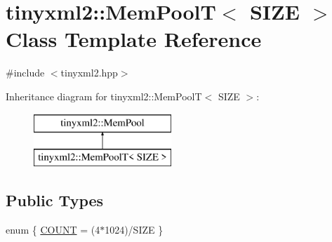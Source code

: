 \hypertarget{classtinyxml2_1_1_mem_pool_t}{\section{tinyxml2\-:\-:Mem\-Pool\-T$<$ S\-I\-Z\-E $>$ Class Template Reference}
\label{classtinyxml2_1_1_mem_pool_t}
}


{\ttfamily \#include $<$tinyxml2.\-hpp$>$}

Inheritance diagram for tinyxml2\-:\-:Mem\-Pool\-T$<$ S\-I\-Z\-E $>$\-:\begin{figure}[H]
\begin{center}
\leavevmode
\includegraphics[height=2.000000cm]{classtinyxml2_1_1_mem_pool_t}
\end{center}
\end{figure}
\subsection*{Public Types}
\begin{DoxyCompactItemize}
\item 
enum \{ \hyperlink{classtinyxml2_1_1_mem_pool_t_a04cf45156e6f913f93972869ff8a1d94a4eeedbaa09fc9968120af6190e9e0988}{C\-O\-U\-N\-T} = (4$\ast$1024)/\-S\-I\-Z\-E
 \}
\end{DoxyCompactItemize}
